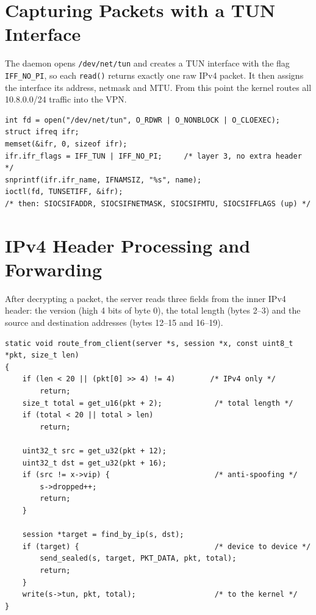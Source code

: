 \documentclass[12pt,a4paper]{report}
\begin{document}
\section{Capturing Packets with a TUN Interface}
The daemon opens \texttt{/dev/net/tun} and creates a TUN interface with the flag
\texttt{IFF\_NO\_PI}, so each \texttt{read()} returns exactly one raw IPv4 packet. It then
assigns the interface its address, netmask and MTU. From this point the kernel routes
all 10.8.0.0/24 traffic into the VPN.

\begin{lstlisting}[caption={Creating the TUN interface (\texttt{src/tun.c})}]
int fd = open("/dev/net/tun", O_RDWR | O_NONBLOCK | O_CLOEXEC);
struct ifreq ifr;
memset(&ifr, 0, sizeof ifr);
ifr.ifr_flags = IFF_TUN | IFF_NO_PI;     /* layer 3, no extra header */
snprintf(ifr.ifr_name, IFNAMSIZ, "%s", name);
ioctl(fd, TUNSETIFF, &ifr);
/* then: SIOCSIFADDR, SIOCSIFNETMASK, SIOCSIFMTU, SIOCSIFFLAGS (up) */
\end{lstlisting}

\section{IPv4 Header Processing and Forwarding}
After decrypting a packet, the server reads three fields from the inner IPv4 header:
the version (high 4 bits of byte 0), the total length (bytes 2--3) and the source and
destination addresses (bytes 12--15 and 16--19).

\begin{lstlisting}[caption={Validating, anti-spoofing and routing a packet (\texttt{src/server.c})}]
static void route_from_client(server *s, session *x, const uint8_t *pkt, size_t len)
{
    if (len < 20 || (pkt[0] >> 4) != 4)        /* IPv4 only */
        return;
    size_t total = get_u16(pkt + 2);            /* total length */
    if (total < 20 || total > len)
        return;

    uint32_t src = get_u32(pkt + 12);
    uint32_t dst = get_u32(pkt + 16);
    if (src != x->vip) {                        /* anti-spoofing */
        s->dropped++;
        return;
    }

    session *target = find_by_ip(s, dst);
    if (target) {                               /* device to device */
        send_sealed(s, target, PKT_DATA, pkt, total);
        return;
    }
    write(s->tun, pkt, total);                  /* to the kernel */
}
\end{lstlisting}
\end{document}
